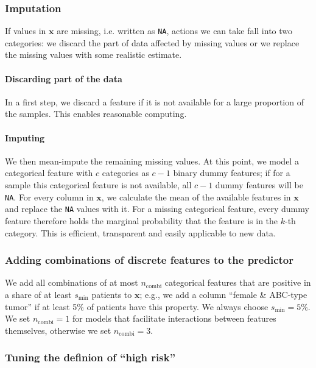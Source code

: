 \subsubsection{Imputation}

If values in $\mathbf{x}$ are missing, i.e. written as \texttt{NA}, actions we can take fall into two 
categories: we discard the part of data affected by missing values or we replace the missing values 
with some realistic estimate.

\paragraph{Discarding part of the data}

In a first step, we discard a feature if it is not available for a large proportion of the samples.
This enables reasonable computing.

\paragraph{Imputing}

We then mean-impute the remaining missing values. At this point, we model a categorical feature 
with $c$ categories as $c-1$ binary dummy features; if for a sample this categorical feature is not 
available, all $c-1$ dummy features will be \texttt{NA}. For every column in $\mathbf{x}$, we calculate the 
mean of the available features in $\mathbf{x}$ and replace the \texttt{NA} values with it. 
For a missing categorical feature, every dummy feature therefore holds the marginal probability 
that the feature is in the $k$-th category. This is efficient, transparent and easily applicable to 
new data.

\subsubsection{Adding combinations of discrete features to the predictor}

We add all combinations of at most $n_\text{combi}$ categorical features that are positive in a 
share of at least $s_\text{min}$ patients to $\mathbf{x}$; e.g., we add a column ``female \& ABC-type 
tumor'' if at least \num{5}\% of patients have this property. We always choose $s_\text{min}
= 5\%$. We set $n_\text{combi} = 1$ for models that facilitate interactions between features 
themselves, otherwise we set $n_\text{combi} = 3$.

\subsubsection{Tuning the definion of ``high risk''}

